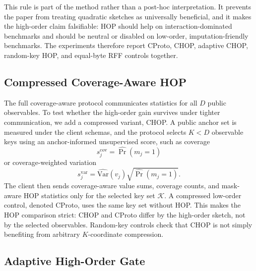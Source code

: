 \documentclass[preprint]{elsarticle}
\newcommand{\cK}{\mathcal{K}}
\begin{document}
This rule is part of the method rather than a post-hoc interpretation. It prevents the paper from treating quadratic sketches as universally beneficial, and it makes the high-order claim falsifiable: HOP should help on interaction-dominated benchmarks and should be neutral or disabled on low-order, imputation-friendly benchmarks. The experiments therefore report CProto, CHOP, adaptive CHOP, random-key HOP, and equal-byte RFF controls together.

\subsection{Compressed Coverage-Aware HOP}

The full coverage-aware protocol communicates statistics for all \(D\) public observables. To test whether the high-order gain survives under tighter communication, we add a compressed variant, CHOP. A public anchor set is measured under the client schemas, and the protocol selects \(K<D\) observable keys using an anchor-informed unsupervised score, such as coverage
\begin{equation}
    s^{\mathrm{cov}}_j = \widehat{\Pr}(m_j=1)
\end{equation}
or coverage-weighted variation
\begin{equation}
    s^{\mathrm{var}}_j =
    \widehat{\mathrm{Var}}(v_j)\sqrt{\widehat{\Pr}(m_j=1)}.
\end{equation}
The client then sends coverage-aware value sums, coverage counts, and mask-aware HOP statistics only for the selected key set \(\cK\). A compressed low-order control, denoted CProto, uses the same key set without HOP. This makes the HOP comparison strict: CHOP and CProto differ by the high-order sketch, not by the selected observables. Random-key controls check that CHOP is not simply benefiting from arbitrary \(K\)-coordinate compression.

\subsection{Adaptive High-Order Gate}
\end{document}
